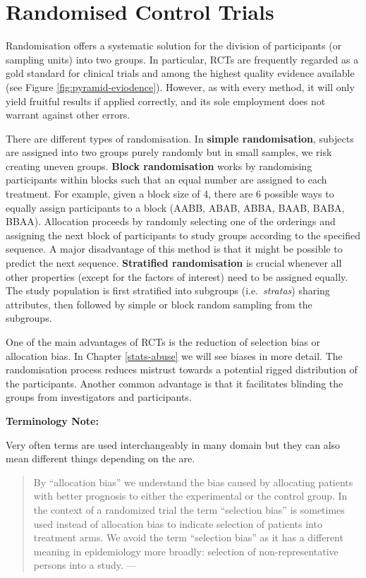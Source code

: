 \documentclass[
]{book}
\begin{document}
\hypertarget{randomised-control-trials}{%
\section{Randomised Control Trials}\label{randomised-control-trials}}

Randomisation offers a systematic solution for the division of participants (or sampling units) into two groups. In particular, RCTs are frequently regarded as a gold standard for clinical trials and among the highest quality evidence available (see Figure \ref{fig:pyramid-eviodence}). However, as with every method, it will only yield fruitful results if applied correctly, and its sole employment does not warrant against other errors.

There are different types of randomisation. In \textbf{simple randomisation}, subjects are assigned into two groups purely randomly but in small samples, we risk creating uneven groups. \textbf{Block randomisation} works by randomising participants within blocks such that an equal number are assigned to each treatment. For example, given a block size of 4, there are 6 possible ways to equally assign participants to a block (AABB, ABAB, ABBA, BAAB, BABA, BBAA). Allocation proceeds by randomly selecting one of the orderings and assigning the next block of participants to study groups according to the specified sequence. A major disadvantage of this method is that it might be possible to predict the next sequence. \textbf{Stratified randomisation} is crucial whenever all other properties (except for the factors of interest) need to be assigned equally. The study population is first stratified into subgroups (i.e.~\emph{stratas}) sharing attributes, then followed by simple or block random sampling from the subgroups.

One of the main advantages of RCTs is the reduction of selection bias or allocation bias. In Chapter \ref{stats-abuse} we will see biases in more detail. The randomisation process reduces mistrust towards a potential rigged distribution of the participants. Another common advantage is that it facilitates blinding the groups from investigators and participants.

\begin{tipbox}

\textbf{Terminology Note:}

Very often terms are used interchangeably in many domain but they can also mean different things depending on the are.

\begin{quote}
By ``allocation bias'' we understand the bias caused by allocating patients with better prognosis to either the experimental or the control group. In the context of a randomized trial the term ``selection bias'' is sometimes used instead of allocation bias to indicate selection of patients into treatment arms. We avoid the term ``selection bias'' as it has a different meaning in epidemiology more broadly: selection of non-representative persons into a study. --- \citep{paludan2016mechanisms}
\end{quote}

\end{tipbox}
\end{document}
